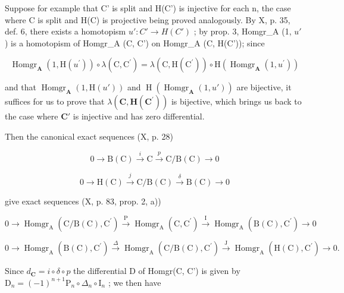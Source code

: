 Suppose for example that C' is split and H(C') is injective for each n, the case where C is split and H(C) is projective being proved analogously. By X, p. 35, def. 6, there exists a homotopism \(u': C' \to H(C')\) ; by prop. 3, Homgr\_A (1, \(u'\) ) is a homotopism of Homgr\_A (C, C') on Homgr\_A (C, H(C')); since

\[
\operatorname{Homgr} _ {\mathbf {A}} \left(1, \mathrm{H} \left(u ^ {\prime}\right)\right) \circ \lambda (\mathrm{C}, \mathrm{C} ^ {\prime}) = \lambda (\mathrm{C}, \mathrm{H} \left(\mathrm{C} ^ {\prime}\right)) \circ \mathrm{H} \left(\operatorname{Homgr} _ {\mathbf {A}} \left(1, u ^ {\prime}\right)\right)
\]

and that \(\operatorname{Homgr}_{\mathbf{A}}(1, \mathrm{H}(u'))\) and \(\operatorname{H}(\operatorname{Homgr}_{\mathbf{A}}(1, u'))\) are bijective, it suffices for us to prove that \(\lambda(\mathbf{C},\mathbf{H}(\mathbf{C}^{\prime}))\) is bijective, which brings us back to the case where \(\mathbf{C}'\) is injective and has zero differential.

Then the canonical exact sequences (X, p. 28)

\[
0 \rightarrow \mathrm{B} (\mathrm{C}) \xrightarrow {i} \mathrm{C} \xrightarrow {p} \mathrm{C} / \mathrm{B} (\mathrm{C}) \rightarrow 0\tag{III}
\]

\[
0 \rightarrow \mathrm{H} (\mathrm{C}) \stackrel {{j}} {{\rightarrow}} \mathrm{C} / \mathrm{B} (\mathrm{C}) \stackrel {{\delta}} {{\rightarrow}} \mathrm{B} (\mathrm{C}) \rightarrow 0\tag{IV}
\]

give exact sequences (X, p. 83, prop. 2, a))

\[
0 \rightarrow \operatorname{Homgr} _ {\mathrm{A}} (\mathrm{C} / \mathrm{B} (\mathrm{C}), \mathrm{C} ^ {\prime}) \xrightarrow {\mathrm{P}} \operatorname{Homgr} _ {\mathrm{A}} (\mathrm{C}, \mathrm{C} ^ {\prime}) \xrightarrow {\mathrm{I}} \operatorname{Homgr} _ {\mathrm{A}} (\mathrm{B} (\mathrm{C}), \mathrm{C} ^ {\prime}) \rightarrow 0
\]

\[
0 \rightarrow \operatorname{Homgr} _ {\mathrm{A}} (\mathrm{B} (\mathrm{C}), \mathrm{C} ^ {\prime}) \stackrel {{\Delta}} {{\rightarrow}} \operatorname{Homgr} _ {\mathrm{A}} (\mathrm{C} / \mathrm{B} (\mathrm{C}), \mathrm{C} ^ {\prime}) \stackrel {{\mathrm{J}}} {{\rightarrow}} \operatorname{Homgr} _ {\mathrm{A}} (\mathrm{H} (\mathrm{C}), \mathrm{C} ^ {\prime}) \rightarrow 0.
\]

Since \(d_{\mathbf{C}} = i \circ \delta \circ p\) the differential D of Homgr(C, C') is given by \(\mathrm{D}_{n} = (-1)^{n+1} \mathrm{P}_{n} \circ \Delta_{n} \circ \mathrm{I}_{n}\) ; we then have


